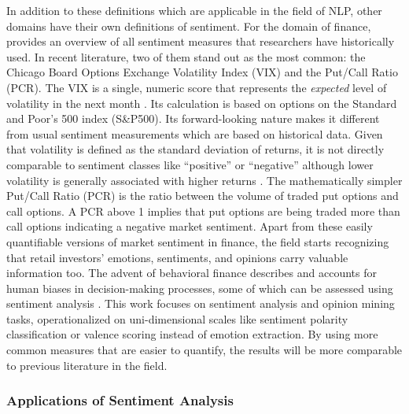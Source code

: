 In addition to these definitions which are applicable in the field of NLP, other domains have their own definitions of sentiment. For the domain of finance,  provides an overview of all sentiment measures that researchers have historically used. In recent literature, two of them stand out as the most common: the Chicago Board Options Exchange Volatility Index (VIX) and the Put/Call Ratio (PCR). The VIX is a single, numeric score that represents the \emph{expected} level of volatility in the next month . Its calculation is based on options on the Standard and Poor's 500 index (S\&P500). Its forward-looking nature makes it different from usual sentiment measurements which are based on historical data. Given that volatility is defined as the standard deviation of returns, it is not directly comparable to sentiment classes like ``positive'' or ``negative'' although lower volatility is generally associated with higher returns . The mathematically simpler Put/Call Ratio (PCR) is the ratio between the volume of traded put options and call options. A PCR above 1 implies that put options are being traded more than call options indicating a negative market sentiment. Apart from these easily quantifiable versions of market sentiment in finance, the field starts recognizing that retail investors' emotions, sentiments, and opinions carry valuable information too. The advent of behavioral finance describes and accounts for human biases in decision-making processes, some of which can be assessed using sentiment analysis .\newline 
This work focuses on sentiment analysis and opinion mining tasks, operationalized on uni-dimensional scales like sentiment polarity classification or valence scoring instead of emotion extraction. By using more common measures that are easier to quantify, the results will be more comparable to previous literature in the field.


\subsubsection{Applications of Sentiment Analysis}

